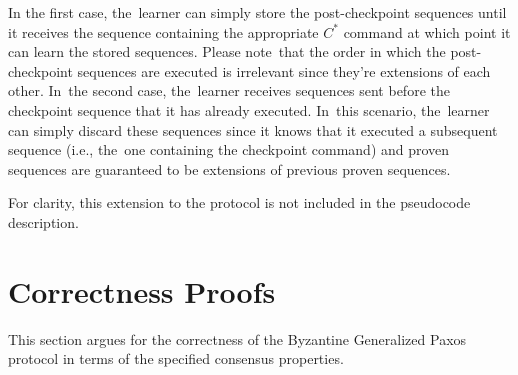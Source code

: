 \documentclass[algorithms,article,accept,moreauthors,pdftex,10pt,a4paper]{Definitions/mdpi}
\begin{document}
In the first case, the~learner can simply store the post-checkpoint sequences until it receives the sequence containing the appropriate $C^*$ command at which point it can learn the stored sequences. Please note~that the order in which the post-checkpoint sequences are executed is irrelevant since they're extensions of each other. In~the second case, the~learner receives sequences sent before the checkpoint sequence that it has already executed. In~this scenario, the~learner can simply discard these sequences since it knows that it executed a subsequent sequence (i.e., the~one containing the checkpoint command) and proven sequences are guaranteed to be extensions of previous proven sequences. \par
For clarity, this extension to the protocol is not included in the pseudocode description.

%
\section{Correctness Proofs} \label{bft_proof}

This section argues for the correctness of the Byzantine Generalized Paxos protocol in terms of the specified consensus properties.\par
\end{document}
